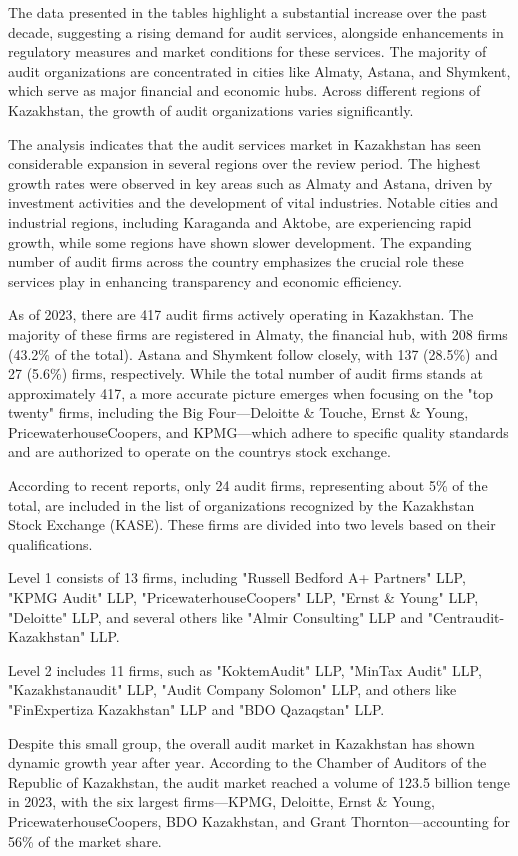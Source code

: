 \begin{multicols}{2}

The data presented in the tables highlight a substantial increase over
the past decade, suggesting a rising demand for audit services,
alongside enhancements in regulatory measures and market conditions for
these services. The majority of audit organizations are concentrated in
cities like Almaty, Astana, and Shymkent, which serve as major financial
and economic hubs. Across different regions of Kazakhstan, the growth of
audit organizations varies significantly.

The analysis indicates that the audit services market in Kazakhstan has
seen considerable expansion in several regions over the review period.
The highest growth rates were observed in key areas such as Almaty and
Astana, driven by investment activities and the development of vital
industries. Notable cities and industrial regions, including Karaganda
and Aktobe, are experiencing rapid growth, while some regions have shown
slower development. The expanding number of audit firms across the
country emphasizes the crucial role these services play in enhancing
transparency and economic efficiency.

As of 2023, there are 417 audit firms actively operating in Kazakhstan.
The majority of these firms are registered in Almaty, the financial hub,
with 208 firms (43.2\% of the total). Astana and Shymkent follow
closely, with 137 (28.5\%) and 27 (5.6\%) firms, respectively. While the
total number of audit firms stands at approximately 417, a more accurate
picture emerges when focusing on the "top twenty" firms, including the
Big Four---Deloitte \& Touche, Ernst \& Young, PricewaterhouseCoopers,
and KPMG---which adhere to specific quality standards and are authorized
to operate on the country\textquotesingle s stock exchange.

According to recent reports, only 24 audit firms, representing about 5\%
of the total, are included in the list of organizations recognized by
the Kazakhstan Stock Exchange (KASE). These firms are divided into two
levels based on their qualifications.

Level 1 consists of 13 firms, including "Russell Bedford A+ Partners"
LLP, "KPMG Audit" LLP, "PricewaterhouseCoopers" LLP, "Ernst \& Young"
LLP, "Deloitte" LLP, and several others like "Almir Consulting" LLP and
"Centraudit-Kazakhstan" LLP.

Level 2 includes 11 firms, such as "KoktemAudit" LLP, "MinTax Audit"
LLP, "Kazakhstanaudit" LLP, "Audit Company Solomon" LLP, and others like
"FinExpertiza Kazakhstan" LLP and "BDO Qazaqstan" LLP.

Despite this small group, the overall audit market in Kazakhstan has
shown dynamic growth year after year. According to the Chamber of
Auditors of the Republic of Kazakhstan, the audit market reached a
volume of 123.5 billion tenge in 2023, with the six largest
firms---KPMG, Deloitte, Ernst \& Young, PricewaterhouseCoopers, BDO
Kazakhstan, and Grant Thornton---accounting for 56\% of the market
share.

\end{multicols}

